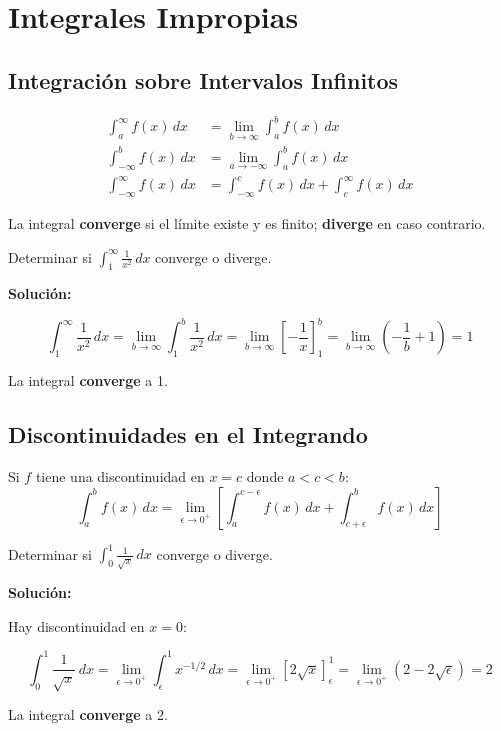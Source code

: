 \documentclass[12pt, a4paper]{book}
\begin{document}
\chapter{Integrales Impropias}

\section{Integración sobre Intervalos Infinitos}

\begin{definicion}
\begin{align}
\int_a^\infty f(x) \, dx &= \lim_{b \to \infty} \int_a^b f(x) \, dx \\
\int_{-\infty}^b f(x) \, dx &= \lim_{a \to -\infty} \int_a^b f(x) \, dx \\
\int_{-\infty}^\infty f(x) \, dx &= \int_{-\infty}^c f(x) \, dx + \int_c^\infty f(x) \, dx
\end{align}

La integral \textbf{converge} si el límite existe y es finito; \textbf{diverge} en caso contrario.
\end{definicion}

\begin{ejemplo}
Determinar si $\int_1^\infty \frac{1}{x^2} \, dx$ converge o diverge.

\textbf{Solución:}

\[
\int_1^\infty \frac{1}{x^2} \, dx = \lim_{b \to \infty} \int_1^b \frac{1}{x^2} \, dx = \lim_{b \to \infty} \left[-\frac{1}{x}\right]_1^b = \lim_{b \to \infty} \left(-\frac{1}{b} + 1\right) = 1
\]

La integral \textbf{converge} a 1.
\end{ejemplo}

\section{Discontinuidades en el Integrando}

\begin{definicion}
Si $f$ tiene una discontinuidad en $x = c$ donde $a < c < b$:
\[
\int_a^b f(x) \, dx = \lim_{\epsilon \to 0^+} \left[\int_a^{c-\epsilon} f(x) \, dx + \int_{c+\epsilon}^b f(x) \, dx\right]
\]
\end{definicion}

\begin{ejemplo}
Determinar si $\int_0^1 \frac{1}{\sqrt{x}} \, dx$ converge o diverge.

\textbf{Solución:}

Hay discontinuidad en $x = 0$:

\[
\int_0^1 \frac{1}{\sqrt{x}} \, dx = \lim_{\epsilon \to 0^+} \int_\epsilon^1 x^{-1/2} \, dx = \lim_{\epsilon \to 0^+} [2\sqrt{x}]_\epsilon^1 = \lim_{\epsilon \to 0^+} (2 - 2\sqrt{\epsilon}) = 2
\]

La integral \textbf{converge} a 2.
\end{ejemplo}
\end{document}
